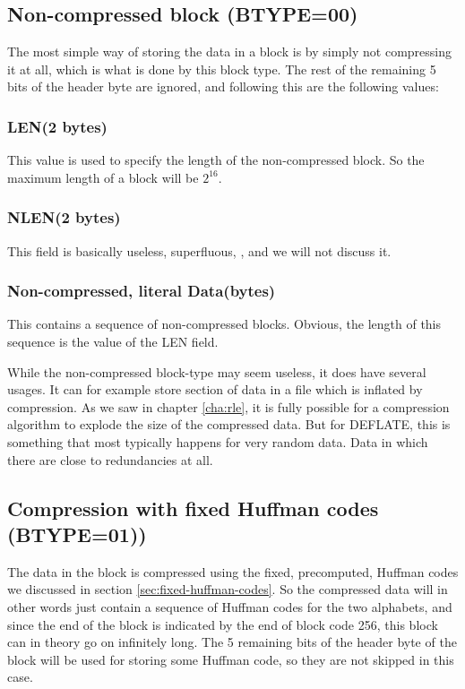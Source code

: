 \subsection{Non-compressed block (BTYPE=00)}

The most simple way of storing the data in a block is by simply not
compressing it at all, which is what is done by this block type. The
rest of the remaining 5 bits of the header byte are ignored, and
following this are the following values:

\subsubsection{LEN(2 bytes)}

This value is used to specify the length of the non-compressed
block. So the maximum length of a block will be $2 ^{16}$.

\subsubsection{NLEN(2 bytes)}

This field is basically useless, superfluous, , and we will not discuss it.

\subsubsection{Non-compressed, literal Data(bytes)}

This contains a sequence of non-compressed blocks. Obvious, the length
of this sequence is the value of the LEN field.

While the non-compressed block-type may seem useless, it does have
several usages. It can for example store section of data in a file
which is inflated by compression. As we saw in chapter \ref{cha:rle},
it is fully possible for a compression algorithm to explode the size
of the compressed data. But for DEFLATE, this is something that most
typically happens for very random data. Data in which there are close
to redundancies at all.

\subsection{Compression with fixed Huffman codes (BTYPE=01))}

The data in the block is compressed using the fixed, precomputed,
Huffman codes we discussed in section
\ref{sec:fixed-huffman-codes}. So the compressed data will in other
words just contain a sequence of Huffman codes for the two alphabets,
and since the end of the block is indicated by the end of block code
256, this block can in theory go on infinitely long. The 5 remaining
bits of the header byte of the block will be used for storing some
Huffman code, so they are not skipped in this case.

